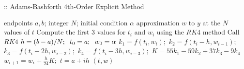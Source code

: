 \documentclass[12pt,oneside]{book}
\begin{document}
\begin{spacing}{1.2}
				\begin{algorithm}[H]
					\caption{:: Adams-Bashforth 4th-Order Explicit Method}
					\begin{algorithmic}[1]
						\REQUIRE endpoints $ a, b $; \hspace*{0.2cm} integer $ N $; \hspace*{0.2cm} initial condition $ \alpha $
						\ENSURE approximation $ w $ to $ y $ at the $ N $ values of $ t $
						\STATE Compute the first 3 values for $ t_{i} $ and $ w_{i} $ using the $ RK4 $ method
						\STATE Call $ RK4 $ \hspace*{0.5cm} 
						\STATE $ h = (b - a) / N; \hspace*{0.2cm} t_0 = a; \hspace*{0.2cm} w_{0} = \alpha $
						\STATE $ k_{1} = f(t_{i},w_{i}); $ \hspace*{0.5cm} 
						\STATE $ k_{2} = f(t_{i} - h, w_{i-1}); $
						\STATE $ k_{3} = f(t_{i} - 2h, w_{i-2}); $
						\STATE $ k_{4} = f(t_{i} - 3h, w_{i-3}); $
						\STATE $ K = 55k_{1} - 59k_{2} + 37k_{3} - 9k_{4}  $
						\STATE $ w_{i+1} = w_{i} + \frac{h}{24}K; $ \hspace*{0.5cm} 
						\STATE $ t = a + ih $ \hspace*{0.5cm} 
						\ENDFOR
						\RETURN $ (t, w) $
					\end{algorithmic}
				\end{algorithm}
			
		\end{spacing}
		
		\clearpage
\end{document}
